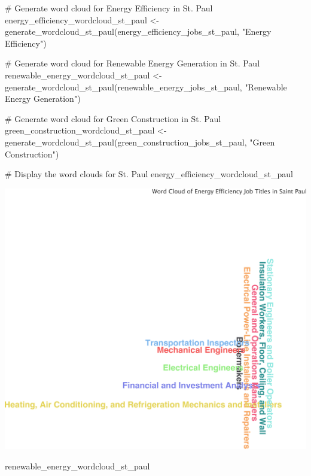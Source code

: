 \documentclass[
  letterpaper,
  DIV=11,
  numbers=noendperiod]{scrartcl}
\newenvironment{Shaded}{\begin{snugshade}}{\end{snugshade}}
\newcommand{\CommentTok}[1]{\textcolor[rgb]{0.37,0.37,0.37}{#1}}
\newcommand{\FunctionTok}[1]{\textcolor[rgb]{0.28,0.35,0.67}{#1}}
\newcommand{\NormalTok}[1]{\textcolor[rgb]{0.00,0.23,0.31}{#1}}
\newcommand{\OtherTok}[1]{\textcolor[rgb]{0.00,0.23,0.31}{#1}}
\newcommand{\StringTok}[1]{\textcolor[rgb]{0.13,0.47,0.30}{#1}}
\begin{document}
\begin{Shaded}
\begin{Highlighting}[]
\CommentTok{\# Generate word cloud for Energy Efficiency in St. Paul}
\NormalTok{energy\_efficiency\_wordcloud\_st\_paul }\OtherTok{\textless{}{-}} \FunctionTok{generate\_wordcloud\_st\_paul}\NormalTok{(energy\_efficiency\_jobs\_st\_paul, }\StringTok{"Energy Efficiency"}\NormalTok{)}

\CommentTok{\# Generate word cloud for Renewable Energy Generation in St. Paul}
\NormalTok{renewable\_energy\_wordcloud\_st\_paul }\OtherTok{\textless{}{-}} \FunctionTok{generate\_wordcloud\_st\_paul}\NormalTok{(renewable\_energy\_jobs\_st\_paul, }\StringTok{"Renewable Energy Generation"}\NormalTok{)}

\CommentTok{\# Generate word cloud for Green Construction in St. Paul}
\NormalTok{green\_construction\_wordcloud\_st\_paul }\OtherTok{\textless{}{-}} \FunctionTok{generate\_wordcloud\_st\_paul}\NormalTok{(green\_construction\_jobs\_st\_paul, }\StringTok{"Green Construction"}\NormalTok{)}

\CommentTok{\# Display the word clouds for St. Paul}
\NormalTok{energy\_efficiency\_wordcloud\_st\_paul}
\end{Highlighting}
\end{Shaded}

\includegraphics{index_files/figure-pdf/unnamed-chunk-23-1.pdf}

\begin{Shaded}
\begin{Highlighting}[]
\NormalTok{renewable\_energy\_wordcloud\_st\_paul}
\end{Highlighting}
\end{Shaded}
\end{document}
